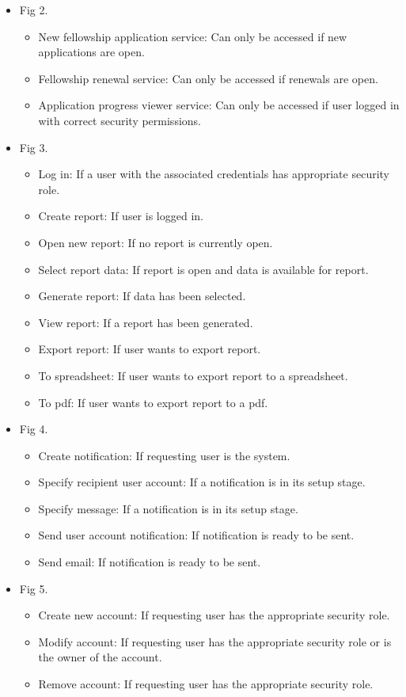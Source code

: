 \documentclass[12pt]{article}
\begin{document}
\begin{itemize}
	\item Fig 2.
	\begin{itemize}
		\item New fellowship application service: Can only be accessed if new applications are open.
		\item Fellowship renewal service: Can only be accessed if renewals are open.
		\item Application progress viewer service: Can only be accessed if user logged in with correct security permissions.	
	\end{itemize}
	
	\item Fig 3.
		\begin{itemize}
			\item Log in: If a user with the associated credentials has appropriate security role.
			\item Create report: If user is logged in.
			\item Open new report: If no report is currently open.
			\item Select report data: If report is open and data is available for report.
			\item Generate report: If data has been selected.
			\item View report: If a report has been generated.
			\item Export report: If user wants to export report.
			\item To spreadsheet: If user wants to export report to a spreadsheet.
			\item To pdf: If user wants to export report to a pdf.	
		\end{itemize}
	
	\item Fig 4.
			\begin{itemize}
				\item Create notification: If requesting user is the system.
				\item Specify recipient user account: If a notification is in its setup stage.				
				\item Specify message: If a notification is in its setup stage.
				\item Send user account notification: If notification is ready to be sent.
				\item Send email: If notification is ready to be sent.	
			\end{itemize}
	
	\item Fig 5.
			\begin{itemize}
				\item Create new account: If requesting user has the appropriate security role.
				\item Modify account: If requesting user has the appropriate security role or is the owner of the account.				
				\item Remove account: If requesting user has the appropriate security role.						
			\end{itemize}
	

\end{itemize}
\end{document}
